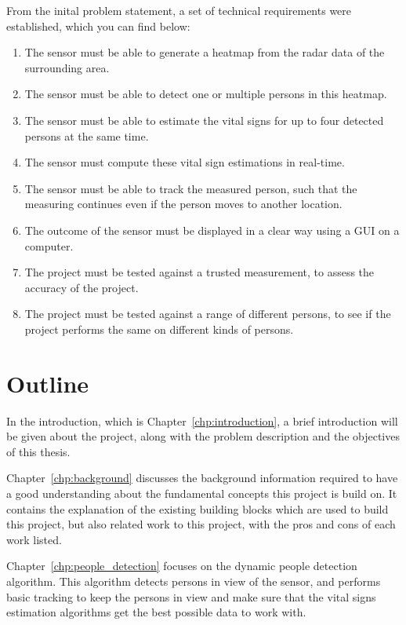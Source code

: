 From the inital problem statement, a set of technical requirements were established, which you can find below:

\begin{enumerate}
    \item The sensor must be able to generate a heatmap from the radar data of the surrounding area.
    \item The sensor must be able to detect one or multiple persons in this heatmap.
    \item The sensor must be able to estimate the vital signs for up to four detected persons at the same time.
    \item The sensor must compute these vital sign estimations in real-time.
    \item The sensor must be able to track the measured person, such that the measuring continues even if the person moves to another location.
    \item The outcome of the sensor must be displayed in a clear way using a GUI on a computer.
    \item The project must be tested against a trusted measurement, to assess the accuracy of the project.
    \item The project must be tested against a range of different persons, to see if the project performs the same on different kinds of persons.
\end{enumerate}

\section{Outline}
In the introduction, which is Chapter~\ref{chp:introduction}, a brief introduction will be given about the project, along with the problem description and the objectives of this thesis.

Chapter~\ref{chp:background} discusses the background information required to have a good understanding about the fundamental concepts this project is build on. It contains the explanation of the existing building blocks which are used to build this project, but also related work to this project, with the pros and cons of each work listed.

Chapter~\ref{chp:people_detection} focuses on the dynamic people detection algorithm. This algorithm detects persons in view of the sensor, and performs basic tracking to keep the persons in view and make sure that the vital signs estimation algorithms get the best possible data to work with.

